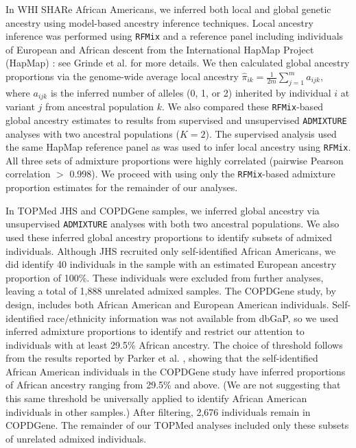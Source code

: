 \documentclass[12pt]{article}
\begin{document}
In WHI SHARe African Americans, we inferred both local and global genetic ancestry using model-based ancestry inference techniques. 
Local ancestry inference was performed using \texttt{RFMix} \citep{rfmix} and a reference panel including individuals of European and African descent from the International HapMap Project (HapMap) \citep{hapmap}: see Grinde et al. \cite{steam} for more details.
We then calculated global ancestry proportions via the genome-wide average local ancestry $\hat\pi_{ik} = \frac{1}{2m}\sum_{j=1}^m a_{ijk},$ where $a_{ijk}$ is the inferred number of alleles (0, 1, or 2) inherited by individual $i$ at variant $j$ from ancestral population $k$.
We also compared these \texttt{RFMix}-based global ancestry estimates to results from supervised and unsupervised \texttt{ADMIXTURE}  \citep{admixture} analyses with two ancestral populations ($K = 2$).
The supervised analysis used the same HapMap reference panel as was used to infer local ancestry using \texttt{RFMix}.
All three sets of admixture proportions were highly correlated (pairwise Pearson correlation $>$ 0.998). 
We proceed with using only the \texttt{RFMix}-based admixture proportion estimates for the remainder of our analyses.

In TOPMed JHS and COPDGene samples, we inferred global ancestry via unsupervised \texttt{ADMIXTURE} analyses with both two ancestral populations. 
We also used these inferred global ancestry proportions to identify subsets of admixed individuals.
Although JHS recruited only self-identified African Americans, we did identify 40 individuals in the sample with an estimated European ancestry proportion of 100\%.
These individuals were excluded from further analyses, leaving a total of 1,888 unrelated admixed samples. 
The COPDGene study, by design, includes both African American and European American individuals.
Self-identified race/ethnicity information was not available from dbGaP, so we used inferred admixture proportions to identify and restrict our attention to individuals with at least 29.5\% African ancestry.
The choice of threshold follows from the results reported by Parker et al. \cite{parker2014}, showing that the self-identified African American individuals in the COPDGene study have inferred proportions of African ancestry ranging from 29.5\% and above.
(We are not suggesting that this same threshold be universally applied to identify African American individuals in other samples.)
After filtering, 2,676 individuals remain in COPDGene. 
The remainder of our TOPMed analyses included only these subsets of unrelated admixed individuals.
\end{document}
